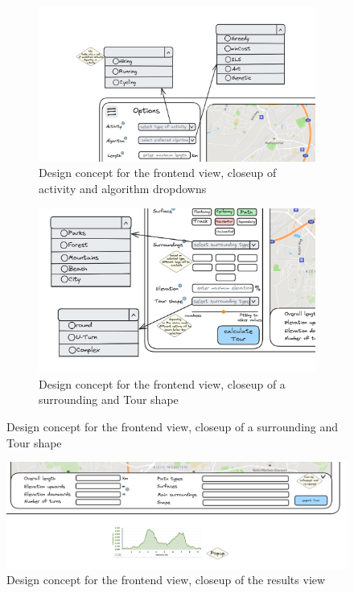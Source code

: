 \begin{figure}[H]
	\begin{subfigure}[t]{0.49\linewidth}
		\centering
		\includegraphics[width=\linewidth]{bilder/Concept closeup activity, algorithm.png}
		\caption{Design concept for the frontend view, closeup of activity and algorithm dropdowns}
		\label{fig:frontendConceptCloseupDropdowns}	
	\end{subfigure}
	\hfill
	\begin{subfigure}[t]{0.49\linewidth}
		\centering
		\includegraphics[width=\linewidth]{bilder/Concept closeup surroundings, tour shape.png}
		\caption{Design concept for the frontend view, closeup of a surrounding and Tour shape}
		\label{fig:frontendConceptCloseupButtons}		
	\end{subfigure}
\end{figure}


\begin{figure}[H]
	\includegraphics[width=0.9\linewidth]{bilder/Concept closeup tour stats, elevation profile.png}
	\caption{Design concept for the frontend view, closeup of the results view}
	\label{fig:frontendConceptResultsCloseup}
\end{figure}



